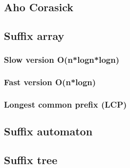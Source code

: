 \subsection{Aho Corasick}


\newpage
\subsection{Suffix array}
\subsubsection{Slow version O(n*logn*logn)}

\subsubsection{Fast version O(n*logn)}

\subsubsection{Longest common prefix (LCP)}


\subsection{Suffix automaton}

\newpage
\subsection{Suffix tree}


